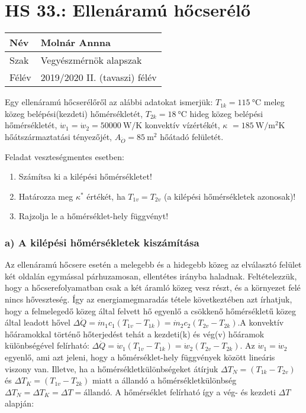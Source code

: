 		
\section*{HS 33.: Ellenáramú hőcserélő}	

\begin{tabular}{ | p{2cm} | p{14cm} | } 
	\hline
	Név & Molnár Annna \\ 
	\hline
	Szak & Vegyészmérnök alapszak \\ 
	\hline
	Félév & 2019/2020 II. (tavaszi) félév \\ 
	\hline
\end{tabular}
\vspace{0.5cm}

\noindent
 Egy ellenáramú hőcserélőről az alábbi adatokat ismerjük:
$T_{1k} = \SI{115}{\celsius}$ meleg közeg belépési(kezdeti) hőmérsékletét,
$T_{2k} = \SI{18}{\celsius}$ hideg közeg belépési hőmérsékletét,
$\dot{w}_1 = \dot{w}_2 =\SI{50000}{\watt\per\kelvin}$ konvektív vízértékét,
$\kappa$ $= \SI{185}{\watt\per\meter\squared\kelvin}$ hőátszármaztatási tényezőjét,
$A_{\ddot{O}} = \SI{85}{\meter\squared}$ hőátadó felületét.
\vspace{5mm}

\noindent
Feladat veszteségmentes esetben:
\begin{enumerate}[label=\alph*)]
 \item Számítsa ki a kilépési hőmérsékletet! 
 \item Határozza meg $\kappa^ *$ értékét, ha $T_{1v} = T_{2v}$ (a kilépési hőmérsékletek azonosak)!
\item Rajzolja le a hőmérséklet-hely függvényt!
\end{enumerate}
\vspace{5mm}
\subsubsection*{a) A kilépési hőmérsékletek kiszámítása}

 Az ellenáramú hőcsere esetén a melegebb és a hidegebb közeg az elválasztó felület két oldalán egymással párhuzamosan, ellentétes irányba haladnak. Feltételezzük, hogy a hőcserefolyamatban csak a két áramló közeg vesz részt, és a környezet felé nincs hőveszteség. Így az energiamegmaradás tétele következtében azt írhatjuk, hogy a felmelegedő közeg által felvett hő egyenlő a csökkenő hőmérsékletű közeg által leadott hővel $\Delta \dot{Q} = \dot{m}_1{c}_1 \left(T_{1v} - T_{1k}\right)=\dot{m}_2{c}_2 \left(T_{2v} - T_{2k}\right)$.A konvektív hőáramokkal történő  hőterjedést tehát a kezdeti(k) és vég(v) hőáramok különbségével felírható: $\Delta \dot{Q} = \dot{w}_1 \left(T_{1v} - T_{1k}\right)=\dot{w}_2 \left(T_{2v} - T_{2k}\right)$.
 Az $\dot{w}_1 = \dot{w}_2$ egyenlő, ami azt jeleni, hogy a hőmérséklet-hely függvények között lineáris viszony van. Illetve, ha a hőmérsékletkülönbségeket átírjuk $\Delta T_N =\left(T_{1k} - T_{2v}\right)$ és $\Delta T_K= \left(T_{1v} - T_{2k}\right)$ miatt a állandó a hőmérsékletkülönbség $\Delta T_N = \Delta T_K = \Delta T = \textrm{állandó}$. A hőmérséklet felírható így a vég- és kezdeti $\Delta T$ alapján:
 
